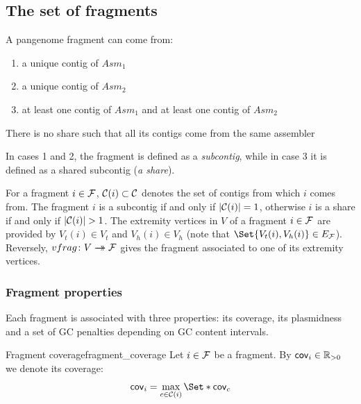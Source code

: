 \subsection{The set of fragments}

A pangenome fragment can come from:

\begin{enumerate}
  \item a unique contig of \(Asm_1\)

  \item a unique contig of \(Asm_2\)

  \item at least one contig of \(Asm_1\) and at least one contig of \(Asm_2\)
\end{enumerate}

\begin{missingproofbox}
    There is no share such that all its contigs come from the same assembler
\end{missingproofbox}

In cases 1 and 2, the fragment is defined as a \emph{subcontig}, while in case 3 it is defined as a shared subcontig (\emph{a share}).

For a fragment \(i \in \mathcal{F}{}\), \(\mathcal{C}{}(i) \subset \mathcal{C}{}\) denotes the set of contigs from which \(i\) comes from. The fragment \(i\) is a subcontig if and only if \(|\mathcal{C}{}(i)| = 1\), otherwise \(i\) is a share if and only if \(|\mathcal{C}{}(i)| > 1\).
The extremity vertices in \(V\) of a fragment \(i \in \mathcal{F}{}\) are provided by \(V_t(i) \in V_t\) and \(V_h(i) \in V_h\) (note that \(\Set{V_t(i), V_h(i)} \in \EFrags{}\)). Reversely, \(vfrag \colon V \rightarrow\mathrel{\mspace{-15mu}}\rightarrow \mathcal{F}{}\) gives the fragment associated to one of its extremity vertices.

\subsubsection{Fragment properties}

Each fragment is associated with three properties: its coverage, its plasmidness and a set of GC penalties depending on GC content intervals.

\begin{definition}{Fragment coverage}{fragment_coverage}
    Let \(i \in \mathcal{F}{}\) be a fragment.
    By \(\mathsf{cov}_{i} \in \mathbb{R}{}_{>0}\) we denote its coverage: 
    \[
    \cov{i} = \max_{c \in \Contigs{}(i)}\Set*{\cov{c}}
    \]
\end{definition}

